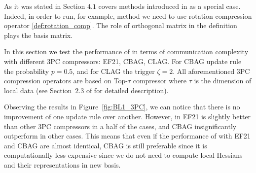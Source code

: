 \documentclass[11pt]{article}
\begin{document}
	As it was stated in Section $4.1$  covers methods introduced in \citep{qian2021basis} as a special case. Indeed, in order to run, for example,  method we need to use rotation compression operator \ref{def:rotation_comp}. The role of orthogonal matrix in the definition plays the basis matrix. 
	
	In this section we test the performance of  in terms of communication complexity with different 3PC compressors: EF21, CBAG, CLAG. For CBAG update rule the probability $p=0.5$, and for CLAG the trigger $\zeta=2$. All aforementioned 3PC compression operators are based on Top-$\tau$ compressor where $\tau$ is the dimension of local data (see Section~$2.3$ of \citep{qian2021basis} for detailed description).
	
	Observing the results in Figure~\ref{fig:BL1_3PC}, we can notice that there is no improvement of one update rule over another. However, in EF21 is slightly better than other 3PC compressors in a half of the cases, and CBAG insignificantly outperform in other cases. This means that even if the performance of  with EF21 and CBAG are almost identical, CBAG is still preferable since it is computationally less expensive since we do not need to compute local Hessians and their representations in new basis.
	
\end{document}
